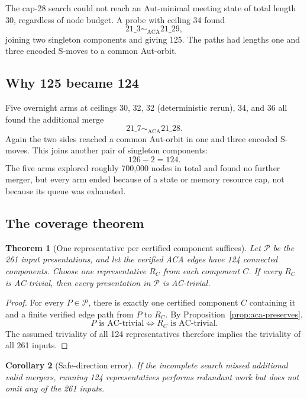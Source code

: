 \documentclass[11pt]{article}
\newtheorem{theorem}{Theorem}[section]
\newtheorem{corollary}[theorem]{Corollary}
\theoremstyle{definition}
\theoremstyle{remark}
\newcommand{\ACA}{\mathrm{ACA}}
\begin{document}
The cap-28 search could not reach an Aut-minimal meeting state of total
length 30, regardless of node budget.  A probe with ceiling 34 found
\[
  21\_3\sim_{\ACA}21\_29,
\]
joining two singleton components and giving 125.  The paths had lengths
one and three encoded S-moves to a common Aut-orbit.

\subsection{Why 125 became 124}

Five overnight arms at ceilings 30, 32, 32 (deterministic rerun), 34, and
36 all found the additional merge
\[
  21\_7\sim_{\ACA}21\_28.
\]
Again the two sides reached a common Aut-orbit in one and three encoded
S-moves.  This joins another pair of singleton components:
\[
  126-2=124.
\]
The five arms explored roughly 700,000 nodes in total and found no further
merger, but every arm ended because of a state or memory resource cap, not
because its queue was exhausted.

\subsection{The coverage theorem}

\begin{theorem}[One representative per certified component suffices]
\label{thm:coverage}
Let \(\mathcal P\) be the 261 input presentations, and let the verified ACA
edges have 124 connected components.  Choose one representative \(R_C\)
from each component \(C\).  If every \(R_C\) is AC-trivial, then every
presentation in \(\mathcal P\) is AC-trivial.
\end{theorem}

\begin{proof}
For every \(P\in\mathcal P\), there is exactly one certified component
\(C\) containing it and a finite verified edge path from \(P\) to \(R_C\).
By Proposition~\ref{prop:aca-preserves},
\[
  P\text{ is AC-trivial}
  \Longleftrightarrow
  R_C\text{ is AC-trivial}.
\]
The assumed triviality of all 124 representatives therefore implies the
triviality of all 261 inputs.
\end{proof}

\begin{corollary}[Safe-direction error]
If the incomplete search missed additional valid mergers, running 124
representatives performs redundant work but does not omit any of the 261
inputs.
\end{corollary}
\end{document}
